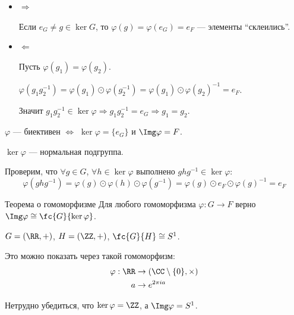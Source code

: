 \begin{itemize}
    \item
        \( \Rightarrow \)

        Если \( e_G \neq g \in \ker G \), то \( \varphi(g) = \varphi(e_G) = e_F \) --- элементы ``склеились''.
    \item
        \( \Leftarrow \)

        Пусть \( \varphi(g_1) = \varphi(g_2) \).

        \( \varphi(g_1 g_2^{-1}) = \varphi(g_1) \odot \varphi(g_2^{-1}) = \varphi(g_1) \odot \varphi(g_2)^{-1} = e_F \).

        Значит \( g_1 g_2^{-1} \in \ker \varphi \Rightarrow g_1 g_2^{-1} = e_G \Rightarrow g_1 = g_2 \).
\end{itemize}

\begin{coroll}{}{}
    \( \varphi \) --- биективен \( \Leftrightarrow \) \( \ker \varphi = \{ e_G \} \) и \( \Img \varphi = F \).
\end{coroll}

\begin{prop}{}{}
    \( \ker \varphi \) --- нормальная подгруппа.
\end{prop}

Проверим, что \( \forall g \in G \), \( \forall h \in \ker \varphi \) выполнено \( g h g^{-1} \in \ker \varphi \):
\[
    \varphi(g h g^{-1})
    =
    \varphi(g) \odot \varphi(h) \odot \varphi(g^{-1})
    =
    \varphi(g) \odot e_F \odot \varphi(g)^{-1}
    =
    e_F
\]

\begin{thrm}{Теорема о гомоморфизме}{}
    Для любого гомоморфизма \( \varphi : G \to F \) верно \( \Img \varphi \cong \fc{G}{\ker \varphi} \).
\end{thrm}

\begin{example}{}{}
    \( G = (\RR, +) \), \( H = (\ZZ, +) \), \( \fc{G}{H} \cong S^1 \).

    Это можно показать через такой гомоморфизм:
    \[
        \begin{aligned}
            \varphi : \RR &\to (\CC \setminus \{ 0 \}, \times)
            \\
            a &\to e^{2 \pi i a}
        \end{aligned}
    \]

    Нетрудно убедиться, что \( \ker \varphi = \ZZ \), а \( \Img \varphi = S^1 \).
\end{example}

